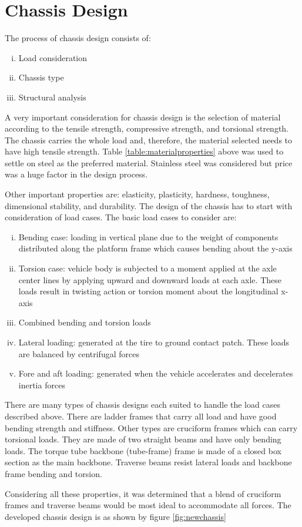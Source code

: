{\sectionbreak}
\section{Chassis Design}
The process of chassis design consists of:
\begin{enumerate}[i.]
    \item Load consideration
    \item Chassis type
    \item Structural analysis
\end{enumerate}

A very important consideration for chassis design is the selection of material according to the tensile strength, compressive strength, and torsional strength. The chassis carries the whole load and, therefore, the material selected needs to have high tensile strength. Table \ref{table:materialproperties} above was used to settle on steel as the preferred material. Stainless steel was considered but price was a huge factor in the design process.
\par
Other important properties are: elasticity, plasticity, hardness, toughness, dimensional stability, and durability. 
The design of the chassis has to start with consideration of load cases. The basic load cases to consider are:
\begin{enumerate}[i.]
    \item Bending case: loading in vertical plane due to the weight of components distributed along the platform frame which causes bending about the y-axis 
    \item Torsion case: vehicle body is subjected to a moment applied at the axle center lines by applying upward and downward loads at each axle. These loads result in twisting action or torsion moment about the longitudinal x-axis 
    \item Combined bending and torsion loads 
    \item Lateral loading: generated at the tire to ground contact patch. These loads are balanced by centrifugal forces 
    \item Fore and aft loading: generated when the vehicle accelerates and decelerates inertia forces 
\end{enumerate}

There are many types of chassis designs each suited to handle the load cases described above. There are ladder frames that carry all load and have good bending strength and stiffness. Other types are cruciform frames which can carry torsional loads. They are made of two straight beams and have only bending loads. The torque tube backbone (tube-frame) frame is made of a closed box section as the main backbone. Traverse beams resist lateral loads and backbone frame bending and torsion. 
\par
Considering all these properties, it was determined that a blend of cruciform frames and traverse beams would be most ideal to accommodate all forces. The developed chassis design is as shown by figure \ref{fig:newchassis}

